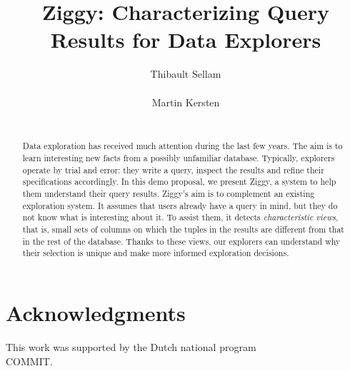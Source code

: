 \documentclass{vldb}
\begin{document}
\title{Ziggy: Characterizing Query Results for Data Explorers}

\author{
\alignauthor
    Thibault Sellam\\
    \\
\alignauthor
Martin Kersten\\
    \\
}


\maketitle
\thispagestyle{empty}

\begin{abstract}
Data exploration has received much attention during the last few years. The aim
is to learn interesting new facts from a possibly unfamiliar database.
Typically, explorers operate by trial and error: they write a query, inspect
the results and refine their specifications accordingly. In this demo proposal,
we present Ziggy, a system to help them understand their query results. Ziggy's
aim is to complement an existing exploration system. It assumes that users
already have a query in mind, but they do not know what is interesting about
it. To assist them, it detects \emph{characteristic views}, that is, small sets
of columns on which the tuples in the results are different from that in the
rest of the database.  Thanks to these views, our explorers can understand why
their selection is unique and make more informed exploration decisions.
\end{abstract}


\section{Acknowledgments}
This work was supported by the Dutch national program \\COMMIT.

\small

\end{document}
